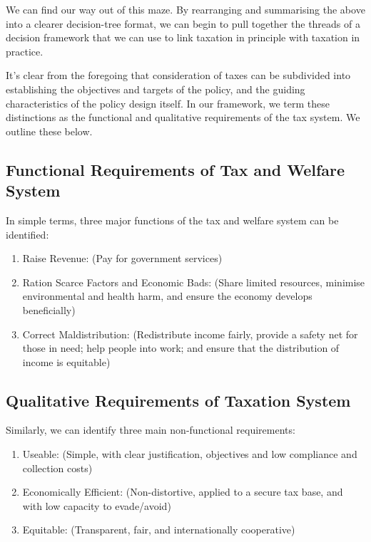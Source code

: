 \documentclass[]{tufte-handout}
\providecommand{\tightlist}{%
  \setlength{\itemsep}{0pt}\setlength{\parskip}{0pt}}
\begin{document}
We can find our way out of this maze. By rearranging and summarising the
above into a clearer decision-tree format, we can begin to pull together
the threads of a decision framework that we can use to link taxation in
principle with taxation in practice.

It's clear from the foregoing that consideration of taxes can be
subdivided into establishing the objectives and targets of the policy,
and the guiding characteristics of the policy design itself. In our
framework, we term these distinctions as the functional and qualitative
requirements of the tax system. We outline these below.

\hypertarget{functional-requirements-of-tax-and-welfare-system}{%
\subsection{Functional Requirements of Tax and Welfare
System}\label{functional-requirements-of-tax-and-welfare-system}}

In simple terms, three major functions of the tax and welfare system can
be identified:

\begin{enumerate}
\def\labelenumi{\arabic{enumi}.}
\tightlist
\item
  Raise Revenue: (Pay for government services)
\item
  Ration Scarce Factors and Economic Bads: (Share limited resources,
  minimise environmental and health harm, and ensure the economy
  develops beneficially)
\item
  Correct Maldistribution: (Redistribute income fairly, provide a safety
  net for those in need; help people into work; and ensure that the
  distribution of income is equitable)
\end{enumerate}

\hypertarget{qualitative-requirements-of-taxation-system}{%
\subsection{Qualitative Requirements of Taxation
System}\label{qualitative-requirements-of-taxation-system}}

Similarly, we can identify three main non-functional requirements:

\begin{enumerate}
\def\labelenumi{\arabic{enumi}.}
\tightlist
\item
  Useable: (Simple, with clear justification, objectives and low
  compliance and collection costs)
\item
  Economically Efficient: (Non-distortive, applied to a secure tax base,
  and with low capacity to evade/avoid)
\item
  Equitable: (Transparent, fair, and internationally cooperative)
\end{enumerate}
\end{document}
